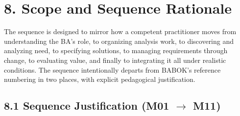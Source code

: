 \documentclass[11pt,letterpaper,oneside]{report}
\begin{document}
\section*{8. Scope and Sequence Rationale}
The sequence is designed to mirror how a competent practitioner moves from understanding the BA's role, to organizing analysis work, to discovering and analyzing need, to specifying solutions, to managing requirements through change, to evaluating value, and finally to integrating it all under realistic conditions. The sequence intentionally departs from BABOK's reference numbering in two places, with explicit pedagogical justification.

\subsection*{8.1 Sequence Justification (M01 $\to$ M11)}
\end{document}
